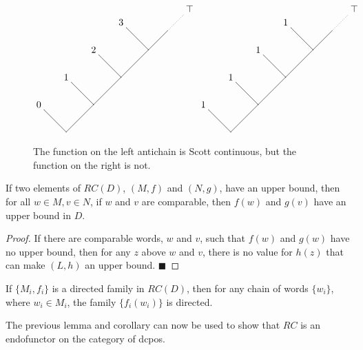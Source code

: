 \begin{figure}
\[
\begin{xy}
(0,10)*+{0} = "v1";%
(20,10)*{} = "v2";%
(10,0)*{} = "v3";%
(10,20)*+{1} = "v6";%
(30,20)*{} = "v7";%
(20,30)*+{2} = "v8";%
(40,30)*{} = "v9";%
(30,40)*+{3} = "v10";%
(47,37)*{} = "v12";%
(55,45)*+{\top} = "v11";%
{\ar@{-} "v3"; "v1"};%
{\ar@{-} "v3"; "v2"};%
{\ar@{-} "v2"; "v6"};%
{\ar@{-} "v2"; "v7"};%
{\ar@{-} "v7"; "v8"};%
{\ar@{-} "v7"; "v9"};%
{\ar@{-} "v9"; "v10"};%
{\ar@{-} "v9"; "v12"};%
{\ar@{..} "v11"; "v12"};
(60,10)*+{1} = "w1";%
(80,10)*{} = "w2";%
(70,0)*{} = "w3";%
(70,20)*+{1} = "w6";%
(90,20)*{} = "w7";%
(80,30)*+{1} = "w8";%
(100,30)*{} = "w9";%
(90,40)*+{1} = "w10";%
(107,37)*{} = "w12";%
(115,45)*+{\top} = "w11";%
{\ar@{-} "w3"; "w1"};%
{\ar@{-} "w3"; "w2"};%
{\ar@{-} "w2"; "w6"};%
{\ar@{-} "w2"; "w7"};%
{\ar@{-} "w7"; "w8"};%
{\ar@{-} "w7"; "w9"};%
{\ar@{-} "w9"; "w10"};%
{\ar@{-} "w9"; "w12"};%
{\ar@{..} "w12"; "w11"};
\end{xy}
\]
\caption[Scott Continuous Functions on Antichains]{The function on the left antichain is Scott continuous, but the function on the right is not.}
\label{RelativeScottContinuity}
\end{figure}

\begin{lemma}
If two elements of $RC(D)$, $(M,f)$ and $(N,g)$, have an upper bound, then for all $w\in M, v\in N$, if $w$ and $v$ are comparable, then $f(w)$ and $g(v)$ have an upper bound in $D$.
\end{lemma}
\begin{proof}
If there are comparable words, $w$ and $v$, such that $f(w)$ and $g(w)$ have no upper bound, then for any $z$ above $w$ and $v$, there is no value for $h(z)$ that can make $(L,h)$ an upper bound.
\hfill $\blacksquare$
\end{proof}

\begin{corollary} \label{directedcor}
If $\{M_i,f_i\}$ is a directed family in $RC(D)$, then for any chain of words $\{w_i\}$, where $w_i\in M_i$, the family $\{f_i(w_i)\}$ is directed.
\end{corollary}

The previous lemma and corollary can now be used to show that $RC$ is an endofunctor on the category of dcpos.

